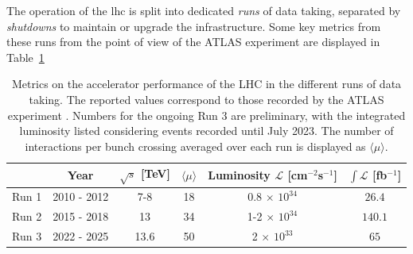 The operation of the \gls{lhc} is split into dedicated \textit{runs} of data taking, separated by \textit{shutdowns} to maintain or upgrade the infrastructure. Some key metrics from these runs from the point of view of the ATLAS experiment are displayed in Table~\ref{tbl:LHCATLASperf}
\begin{table}[!htbp]
    \begin{center}
        \renewcommand{\arraystretch}{1.2}
        \begin{tabular}{cc|cccc} \hline \hline 
          & Year & $\sqrt{s}$ [TeV] & $\langle \mu \rangle$ &  Luminosity $\mathcal{L}$ [cm$^{-2}$s$^{-1}$] & $\int\mathcal{L}$ [fb$^{-1}$] \\ \hline
          Run 1 & 2010 - 2012 & 7-8    & 18 & 0.8 $\times$ $10^{34}$    & $26.4$ \\
          Run 2 & 2015 - 2018 & 13     & 34 & 1-2 $\times$ $10^{34}$  & $140.1$ \\
          Run 3 & 2022 - 2025 & 13.6     & 50 & 2 $\times$ $10^{33}$    & $65$ \\

          \hline\hline
        \end{tabular}
      \caption{Metrics on the accelerator performance of the LHC in the different runs of data taking. The reported values correspond to those recorded by the ATLAS experiment \cite{ATLAS:run1Lumi, ATLAS:2022hro, ATL-DAPR-PUB-2023-001}. Numbers for the ongoing Run 3 are preliminary, with the integrated luminosity listed considering events recorded until July 2023. The number of interactions per bunch crossing averaged over each run is displayed as $\langle \mu \rangle$.} %
      \label{tbl:LHCATLASperf}
    \end{center}
\end{table}

